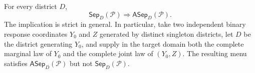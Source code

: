 For every district \(D\),
\[
\mathsf{Sep}_D(\mathcal P)\Longrightarrow\mathsf{ASep}_D(\mathcal P).
\]
The implication is strict in general.  In particular, take two independent binary response coordinates \(Y_0\) and \(Z\) generated by distinct singleton districts, let \(D\) be the district generating \(Y_0\), and supply in the target domain both the complete marginal law of \(Y_0\) and the complete joint law of \((Y_0,Z)\).  The resulting menu satisfies \(\mathsf{ASep}_D(\mathcal P)\) but not \(\mathsf{Sep}_D(\mathcal P)\).